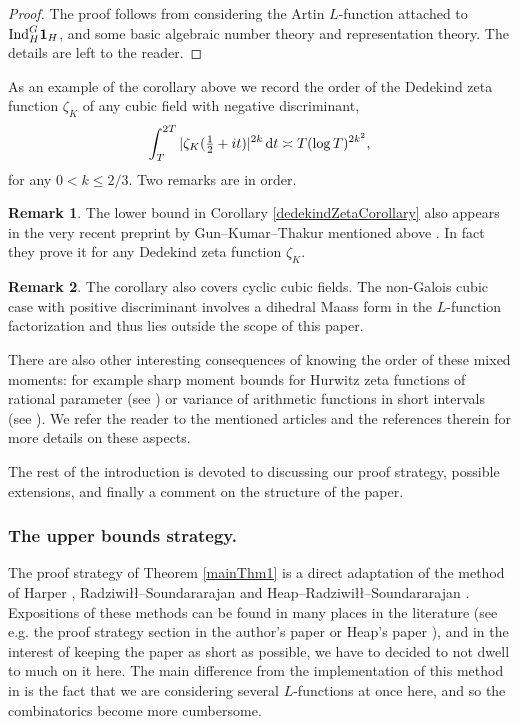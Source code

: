 \documentclass[oneside, 12pt]{amsart}
\theoremstyle{definition}
\newtheorem*{rem}{Remark}
\newcommand{\dt}{\, \textup{d}t}
\begin{document}
	\begin{proof}
		The proof follows from considering the Artin $L$-function attached to $\textup{Ind}_H^G \mathbf{1}_H$, and some basic algebraic number theory and representation theory. The details are left to the reader.
	\end{proof}
	
	As an example of the corollary above we record the order of the Dedekind zeta function $\zeta_K$ of any cubic field with negative discriminant, $$\int_T^{2T} |\zeta_K(\tfrac12+it)|^{2k}\dt \asymp T(\log T)^{2k^2},$$ for any $0<k\leq 2/3$.  Two remarks are in order.
	
	\begin{rem}
		The lower bound in Corollary \ref{dedekindZetaCorollary} also appears in the very recent preprint by Gun--Kumar--Thakur mentioned above \cite{GunKumarThakur}. In fact they prove it for any Dedekind zeta function $\zeta_K$. 
	\end{rem}

	\begin{rem}
		The corollary also covers cyclic cubic fields. The non-Galois
		cubic case with positive discriminant involves a dihedral Maass
		form in the $L$-function factorization and thus lies outside the scope of this paper.
	\end{rem}

	There are also other interesting consequences of knowing the order of these mixed moments: for example sharp moment bounds for Hurwitz zeta functions of rational parameter (see \cite[Corollary 1.6]{Hagen1}) or variance of arithmetic functions in short intervals (see \cite[Theorem 1.4]{MilinoButter1}). We refer the reader to the mentioned articles and the references therein for more details on these aspects.

	The rest of the introduction is devoted to discussing our proof strategy, possible extensions, and finally a comment on the structure of the paper.
	
	\subsubsection*{The upper bounds strategy.} The proof strategy of Theorem \ref{mainThm1} is a direct adaptation of the method of Harper \cite{Harper1}, Radziwi\l\l--Soundararajan \cite{RS2} and Heap--Radziwi\l\l--Soundararajan \cite{HeapRadSound1}. Expositions of these methods can be found in many places in the literature (see e.g. the proof strategy section in the author's paper \cite{Hagen1} or Heap's paper \cite{Heap3}), and in the interest of keeping the paper as short as possible, we have to decided to not dwell to much on it here. The main difference from the implementation of this method in \cite{HeapRadSound1} is the fact that we are considering several $L$-functions at once here, and so the combinatorics become more cumbersome. 
	
\end{document}
